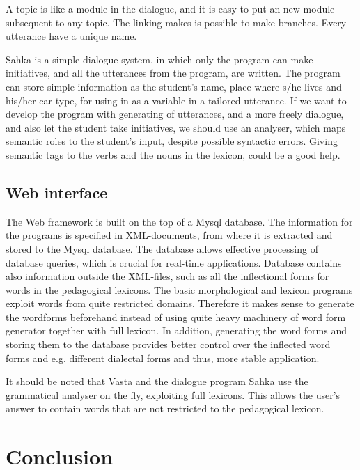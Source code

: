 \documentclass[11pt]{article}
\begin{document}
A topic is like a module in the dialogue, and it is easy to put an new module subsequent to any topic. The linking makes is possible to make branches. Every utterance have a unique name.  

Sahka is a simple dialogue system, in which only the program can make initiatives, and all the utterances from the program, are written. The program can store simple information as the student's name, place where s/he lives and his/her car type, for using in as a variable in a tailored utterance. If we want to develop the program with generating of utterances, and a more freely dialogue, and also let the student take initiatives, we should use an analyser, which maps semantic roles to the student's input, despite possible syntactic errors. Giving semantic tags to the verbs and the nouns in the lexicon, could be a good help. 



\subsection{Web interface}

The Web framework is built on the top of a Mysql database. The information for the programs is specified in XML-documents, from where it is extracted and stored to the Mysql database. The database allows effective processing of database queries, which is crucial for real-time applications. Database contains also information outside the XML-files, such as all the inflectional forms for words in the pedagogical lexicons. The basic morphological and lexicon programs exploit words from quite restricted domains. Therefore it makes sense to generate the wordforms beforehand instead of using quite heavy machinery of word form generator together with full lexicon. In addition, generating the word forms and storing them to the database provides better control over the inflected word forms and e.g. different dialectal forms and thus, more stable application.

It should be noted that Vasta and the dialogue program Sahka use the grammatical analyser on the fly, exploiting full lexicons. This allows the user's answer to contain words that are not restricted to the pedagogical lexicon.



\section{Conclusion}
\end{document}
